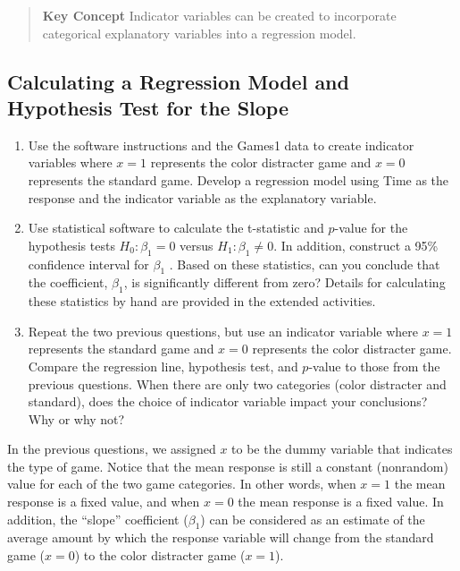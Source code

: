 \documentclass[
]{report}
\theoremstyle{definition}
\theoremstyle{definition}
\theoremstyle{definition}
\theoremstyle{definition}
\theoremstyle{remark}
\begin{document}
\begin{quote}
\textbf{Key Concept}
Indicator variables can be created to incorporate categorical explanatory variables into a regression model.
\end{quote}

\hypertarget{calculating-a-regression-model-and-hypothesis-test-for-the-slope}{%
\subsection*{Calculating a Regression Model and Hypothesis Test for the Slope}\label{calculating-a-regression-model-and-hypothesis-test-for-the-slope}}

\begin{enumerate}
\def\labelenumi{\arabic{enumi}.}
\setcounter{enumi}{10}
\item
  Use the software instructions and the Games1 data to create indicator variables where \(x = 1\) represents the color distracter game and \(x = 0\) represents the standard game. Develop a regression model using Time as the response and the indicator variable as the explanatory variable.
\item
  Use statistical software to calculate the t-statistic and \(p\)-value for the hypothesis tests \(H_0 : \beta_1 = 0\) versus \(H_1 : \beta_1 \ne 0\). In addition, construct a 95\% confidence interval for \(\beta_1\) . Based on these statistics, can you conclude that the coefficient, \(\beta_1\), is significantly different from zero? Details for calculating these statistics by hand are provided in the extended activities.
\item
  Repeat the two previous questions, but use an indicator variable where \(x = 1\) represents the standard game and \(x = 0\) represents the color distracter game. Compare the regression line, hypothesis test, and \(p\)-value to those from the previous questions. When there are only two categories (color distracter and standard), does the choice of indicator variable impact your conclusions? Why or why not?
\end{enumerate}

In the previous questions, we assigned \(x\) to be the dummy variable that indicates the type of game. Notice that the mean response is still a constant (nonrandom) value for each of the two game categories. In other
words, when \(x = 1\) the mean response is a fixed value, and when \(x = 0\) the mean response is a fixed value. In addition, the ``slope'' coefficient (\(\beta_1\)) can be considered as an estimate of the average amount by which the response variable will change from the standard game (\(x = 0\)) to the color distracter game (\(x = 1\)).
\end{document}
